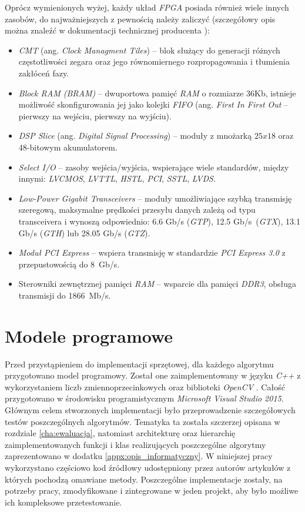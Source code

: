 Oprócz wymienionych wyżej, każdy układ \textit{FPGA} posiada również wiele innych zasobów, do najważniejszych z pewnością należy zaliczyć (szczegółowy opis można znaleźć w dokumentacji technicznej producenta \cite{xilinx_7series_overview}):
    \begin{itemize}[label=$\bullet$]
    \item \textit{CMT} (ang. \textit{Clock Managment Tiles}) -- blok służący do generacji różnych częstotliwości zegara oraz jego równomiernego rozpropagowania i tłumienia zakłóceń fazy.
    \item \textit{Block RAM (BRAM)} -- dwuportowa pamięć \textit{RAM} o rozmiarze 36Kb, istnieje możliwość skonfigurowania jej jako kolejki \textit{FIFO} (ang. \textit{First In First Out} -- pierwszy na wejściu, pierwszy na wyjściu). 
    \item \textit{DSP Slice} (ang. \textit{Digital Signal Processing}) -- moduły z mnożarką $25x18$ oraz 48-bitowym akumulatorem.
    \item \textit{Select I/O} -- zasoby wejścia/wyjścia, wspierające wiele standardów, między innymi: \textit{LVCMOS},
\textit{LVTTL}, \textit{HSTL}, \textit{PCI}, \textit{SSTL}, \textit{LVDS}.
    \item \textit{Low-Power Gigabit Transceivers} -- moduły umożliwiające szybką transmisję szeregową, maksymalne prędkości przesyłu danych zależą od typu transceivera i wynoszą odpowiednio: \num{6.6} Gb/s (\textit{GTP}), \num{12.5} Gb/s~(\textit{GTX}), \num{13.1} Gb/s (\textit{GTH}) lub \num{28.05} Gb/s (\textit{GTZ}).
    \item \textit{Moduł PCI Express} -- wspiera transmisję w standardzie \textit{PCI Express 3.0} z przepustowością do \num{8}~Gb/s.
    \item Sterowniki zewnętrznej pamięci \textit{RAM} -- wsparcie dla pamięci \textit{DDR3}, obsługa transmisji do \num{1866}~Mb/s.
    \end{itemize}


\section{Modele programowe}
\label{sec:modele_programowe}

Przed przystąpieniem do implementacji sprzętowej, dla każdego algorytmu przygotowano model programowy. 
Został one zaimplementowany w języku \textit{C++} z wykorzystaniem liczb zmiennoprzecinkowych oraz biblioteki \textit{OpenCV} \cite{opencv_17}. 
Całość przygotowano w środowisku programistycznym \textit{Microsoft Visual Studio 2015}. 
Głównym celem stworzonych implementacji było przeprowadzenie szczegółowych testów poszczególnych algorytmów. 
Tematyka ta została szczerzej opisana w rozdziale \ref{cha:ewaluacja}, natomiast architekturę oraz hierarchię zaimplementowanych funkcji i klas realizujących poszczególne algorytmy zaprezentowano w dodatku \ref{appx:opis_informatyczny}. W niniejszej pracy wykorzystano częściowo kod źródłowy udostępniony przez autorów artykułów z których pochodzą omawiane metody. Poszczególne implementacje zostały, na potrzeby pracy, zmodyfikowane i zintegrowane w jeden projekt, aby było możliwe ich kompleksowe przetestowanie.

